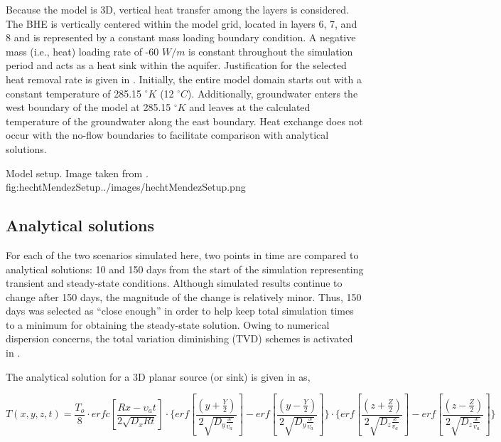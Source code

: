 Because the model is 3D, vertical heat transfer among the layers is considered.  The BHE is vertically centered within the model grid, located in layers 6, 7, and 8 and is represented by a constant mass loading boundary condition.  A negative mass (i.e., heat) loading rate of -60 $W/m$ is constant throughout the simulation period and acts as a heat sink within the aquifer.  Justification for the selected heat removal rate is given in \cite{hechtMendez2010}.  Initially, the entire model domain starts out with a constant temperature of 285.15 $^{\circ}K$ (12 $^{\circ}C$).  Additionally, groundwater enters the west boundary of the model at 285.15 $^{\circ}K$ and leaves at the calculated temperature of the groundwater along the east boundary.  Heat exchange does not occur with the no-flow boundaries to facilitate comparison with analytical solutions. 

\begin{StandardFigure}{
                                     Model setup.  Image taken from \cite{hechtMendez2010}.
                                     }{fig:hechtMendezSetup}{../images/hechtMendezSetup.png}
\end{StandardFigure}       

\subsection{Analytical solutions}

For each of the two scenarios simulated here, two points in time are compared to analytical solutions: 10 and 150 days from the start of the simulation representing transient and steady-state conditions.  Although simulated results continue to change after 150 days, the magnitude of the change is relatively minor.  Thus, 150 days was selected as ``close enough'' in order to help keep total simulation times to a minimum for obtaining the steady-state solution.  Owing to numerical dispersion concerns, the total variation diminishing (TVD) schemes is activated in \mf. 

The analytical solution for a 3D planar source (or sink) is given in \citep{domenico1985} as,

\begin{equation*}
T \left( x, y, z, t \right) = \frac{T_o}{8} \cdot erfc \left[ \frac{Rx - \upsilon_a t}{2 \sqrt{D_x R t}} \right] \cdot \Bigg\{ erf \left[ \frac{ \left( y + \frac{Y}{2} \right)}{2 \sqrt{D_y \frac{x}{v_a}}} \right] -  erf \left[ \frac{ \left( y - \frac{Y}{2} \right)}{2 \sqrt{D_y \frac{x}{v_a}}} \right] \Bigg\} \cdot \Bigg\{ erf \left[ \frac{ \left( z + \frac{Z}{2} \right)}{2 \sqrt{D_z \frac{x}{v_a}}} \right] -  erf \left[ \frac{ \left( z - \frac{Z}{2} \right)}{2 \sqrt{D_z \frac{x}{v_a}}} \right] \Bigg\}
\end{equation*}

